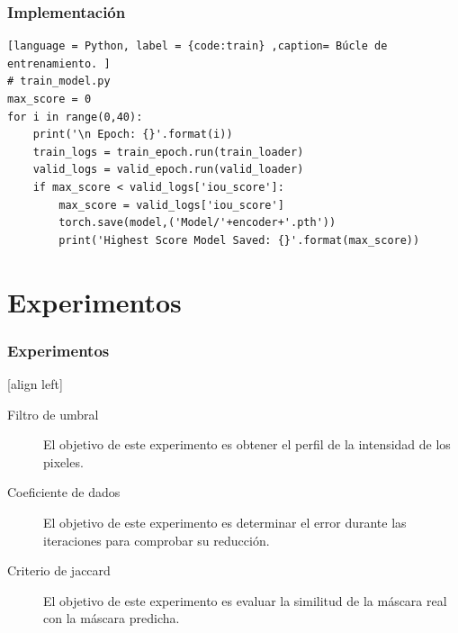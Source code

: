 \documentclass{beamer}
\begin{document}
\begin{frame}[fragile]
\frametitle{Implementación}
\begin{lstlisting}[language = Python, label = {code:train} ,caption= Búcle de entrenamiento. ]
# train_model.py
max_score = 0 
for i in range(0,40):
    print('\n Epoch: {}'.format(i))
    train_logs = train_epoch.run(train_loader)
    valid_logs = valid_epoch.run(valid_loader)
    if max_score < valid_logs['iou_score']:
        max_score = valid_logs['iou_score']
        torch.save(model,('Model/'+encoder+'.pth'))
        print('Highest Score Model Saved: {}'.format(max_score))
\end{lstlisting}
\end{frame}

\section{Experimentos}

\begin{frame}
    \frametitle{Experimentos}
    [align left]
    \begin{description}
        \item[Filtro de umbral] El objetivo de este experimento es obtener el perfil de la intensidad de los pixeles.
        \item[Coeficiente de dados] El objetivo de este experimento es determinar el error durante las iteraciones para comprobar su reducción.
        \item[Criterio de jaccard] El objetivo de este experimento es evaluar la similitud de la máscara real con la máscara predicha.   
    \end{description}
\end{frame}
\end{document}
